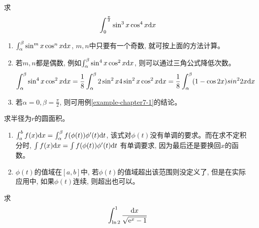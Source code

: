 \begin{example}
    求
    \begin{equation*}
        \int_0^{\frac{\pi}{2}} \sin^3x\cos^4x \mathrm{d} x
    \end{equation*}
\end{example}
\begin{solution}
    
\end{solution}
\begin{remark}
    \begin{enumerate}
        \item $\int_\alpha^\beta \sin^mx\cos^nx \mathrm{d} x$, $m, n$中只要有一个奇数, 就可按上面的方法计算。
        \item 若$m, n$都是偶数, 例如$\int_\alpha^\beta \sin^4x\cos^2x \mathrm{d} x$, 则可以通过三角公式降低次数。
        \begin{equation*}
            \int_\alpha^\beta \sin^4x\cos^2x \mathrm{d} x = \frac{1}{8}\int_\alpha^\beta 2\sin^2x 4\sin^2x\cos^2x \mathrm{d} x = \frac{1}{8} \int_\alpha^\beta (1-\cos2x)sin^22x \mathrm{d} x
        \end{equation*}
        \item 若$\alpha = 0, \beta = \frac{\pi}{2}$, 则可用例\ref{example-chapter7-1}的结论。
    \end{enumerate}
\end{remark}

\begin{example}
    求半径为$r$的圆面积。
\end{example}
\begin{solution}
    
\end{solution}
\begin{remark}
    \begin{enumerate}
        \item $\int_a^bf(x)\mathrm{d} x = \int_\alpha^\beta f(\phi(t))\phi'(t)\mathrm{d} t$, 该式对$\phi(t)$没有单调的要求。而在求不定积分时, $\int f(x)\mathrm{d} x = \int f(\phi(t))\phi'(t)\mathrm{d} t$ 有单调要求, 因为最后还是要换回$x$的函数。
        \item $\phi(t)$的值域在$[a, b]$中, 若$\phi(t)$的值域超出该范围则没定义了, 但是在实际应用中, 如果$\phi(t)$连续, 则超出也可以。
    \end{enumerate}
\end{remark}

\begin{example}
    求
    \begin{equation*}
        \int_{\ln2}^1 \frac{\mathrm{d} x}{\sqrt{\mathrm{e}^x-1}}
    \end{equation*}
\end{example}
\begin{solution}
    
\end{solution}

